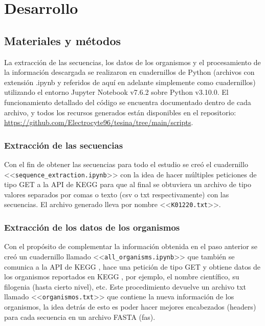 \section{Desarrollo}

\subsection{Materiales y métodos}
La extracción de las secuencias, los datos de los organismos y el procesamiento de la información descargada se realizaron en cuadernillos de Python (archivos con extensión .ipynb y  referidos de aquí en adelante simplemente como cuadernillos) utilizando el entorno Jupyter Notebook v7.6.2 \parencite{Kluyver_Thomas_2016} sobre Python v3.10.0. El funcionamiento detallado del código se encuentra documentado dentro de cada archivo, y todos los recursos generados están disponibles en el repositorio:  \url{https://github.com/Electrocyte96/tesina/tree/main/scripts}.

\subsubsection{Extracción de las secuencias}
Con el fin de obtener las secuencias para todo el estudio se creó el cuadernillo \\<<\texttt{sequence\_extraction.ipynb}>> con la idea de hacer múltiples peticiones de tipo GET a la API de KEGG \parencite{Kanehisa_2004} para que al final se obtuviera un archivo de tipo valores separados por comas o texto (csv o txt respectivamente) con las secuencias. El archivo generado lleva por nombre <<\texttt{K01220.txt}>>. 

\subsubsection{Extracción de los datos de los organismos}
Con el propósito de complementar la información obtenida en el paso anterior se creó un cuadernillo llamado <<\texttt{all\_organisms.ipynb}>> que también se comunica a la API de KEGG \parencite{Kanehisa_2004}, hace una petición de tipo GET y obtiene datos de los organismos reportados en KEGG \parencite{Kanehisa_2004}, por ejemplo, el nombre científico, su filogenia (hasta cierto nivel), etc. Este procedimiento devuelve un archivo txt llamado <<\texttt{organismos.txt}>> que contiene la nueva información de los organismos, la idea detrás de esto es poder hacer mejores encabezados (headers) para cada secuencia en un archivo FASTA (fas).

